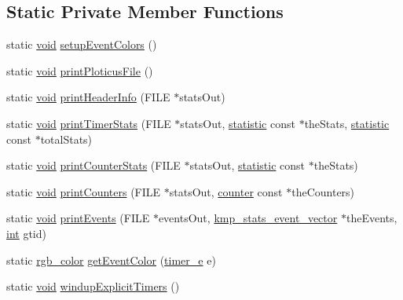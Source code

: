 \subsection*{Static Private Member Functions}
\begin{DoxyCompactItemize}
\item 
static \hyperlink{ittnotify__static_8h_af941d56e55e3c5465135b60c4d6343ed}{void} \hyperlink{classkmp__stats__output__module_a380fd50943ea69ad95fc791620f174a1}{setup\-Event\-Colors} ()
\item 
static \hyperlink{ittnotify__static_8h_af941d56e55e3c5465135b60c4d6343ed}{void} \hyperlink{classkmp__stats__output__module_ab420469069beaafe42d54569103a7b85}{print\-Ploticus\-File} ()
\item 
static \hyperlink{ittnotify__static_8h_af941d56e55e3c5465135b60c4d6343ed}{void} \hyperlink{classkmp__stats__output__module_abc56f7bd50f29fdc7b9980d31c95433a}{print\-Header\-Info} (F\-I\-L\-E $\ast$stats\-Out)
\item 
static \hyperlink{ittnotify__static_8h_af941d56e55e3c5465135b60c4d6343ed}{void} \hyperlink{classkmp__stats__output__module_afbfb63055322654b4d730d8d55283918}{print\-Timer\-Stats} (F\-I\-L\-E $\ast$stats\-Out, \hyperlink{classstatistic}{statistic} const $\ast$the\-Stats, \hyperlink{classstatistic}{statistic} const $\ast$total\-Stats)
\item 
static \hyperlink{ittnotify__static_8h_af941d56e55e3c5465135b60c4d6343ed}{void} \hyperlink{classkmp__stats__output__module_a133f6d878d1cfbfb983bd144f6f9af1c}{print\-Counter\-Stats} (F\-I\-L\-E $\ast$stats\-Out, \hyperlink{classstatistic}{statistic} const $\ast$the\-Stats)
\item 
static \hyperlink{ittnotify__static_8h_af941d56e55e3c5465135b60c4d6343ed}{void} \hyperlink{classkmp__stats__output__module_a644fe1493663049283e648cdce5b0d15}{print\-Counters} (F\-I\-L\-E $\ast$stats\-Out, \hyperlink{classcounter}{counter} const $\ast$the\-Counters)
\item 
static \hyperlink{ittnotify__static_8h_af941d56e55e3c5465135b60c4d6343ed}{void} \hyperlink{classkmp__stats__output__module_a08dca734e6b3a759da7593d8e19ba20f}{print\-Events} (F\-I\-L\-E $\ast$events\-Out, \hyperlink{classkmp__stats__event__vector}{kmp\-\_\-stats\-\_\-event\-\_\-vector} $\ast$the\-Events, \hyperlink{ittnotify__static_8h_a8b8dcd723308a8cb5d84277c7a3fff70}{int} gtid)
\item 
static \hyperlink{structkmp__stats__output__module_1_1rgb__color}{rgb\-\_\-color} \hyperlink{classkmp__stats__output__module_ae2d4837ff9b0b4f6fbd0f0ea252a4df4}{get\-Event\-Color} (\hyperlink{kmp__stats_8h_ae03f1e0ff609f86afa9b7167a12c6c06}{timer\-\_\-e} e)
\item 
static \hyperlink{ittnotify__static_8h_af941d56e55e3c5465135b60c4d6343ed}{void} \hyperlink{classkmp__stats__output__module_a899a6909e92d51c4499e9ae122e2c1dd}{windup\-Explicit\-Timers} ()
\end{DoxyCompactItemize}
